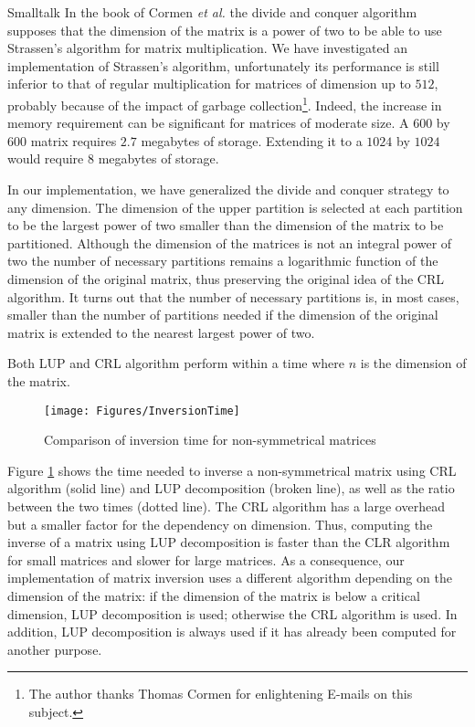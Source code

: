 \begin{displaycode}{Smalltalk}
In the book of Cormen \textit{et al.} \cite{CorLeiRiv} the divide and
conquer algorithm supposes that the dimension of the matrix is a
power of two to be able to use Strassen's algorithm for matrix
multiplication. We have investigated an implementation of
Strassen's algorithm, unfortunately its performance is still
inferior to that of regular multiplication for matrices of
dimension up to $512$, probably because of the impact of garbage
collection\footnote{The author thanks Thomas Cormen for
enlightening E-mails on this subject.}. Indeed, the increase in
memory requirement can be significant for matrices of moderate
size. A $600$ by $600$ matrix requires $2.7$ megabytes of storage.
Extending it to a $1024$ by $1024$ would require $8$ megabytes of
storage.

 In our implementation, we have
generalized the divide and conquer strategy to any dimension. The
dimension of the upper partition is selected at each partition to
be the largest power of two smaller than the dimension of the
matrix to be partitioned. Although the dimension of the matrices
is not an integral power of two the number of necessary partitions
remains a logarithmic function of the dimension of the original
matrix, thus preserving the original idea of the CRL algorithm. It
turns out that the number of necessary partitions is, in most
cases, smaller than the number of partitions needed if the
dimension of the original matrix is extended to the nearest
largest power of two.

Both LUP and CRL algorithm perform within a time  where
$n$ is the dimension of the matrix.
\begin{figure}
\centering\texttt{[image: Figures/InversionTime]}
\caption{Comparison of inversion time for non-symmetrical
matrices}\label{fig:inversionTime}
\end{figure}
Figure \ref{fig:inversionTime} shows the time needed to inverse a
non-symmetrical matrix using CRL algorithm (solid line) and LUP
decomposition (broken line), as well as the ratio between the two
times (dotted line). The CRL algorithm has a large overhead but a
smaller factor for the dependency on dimension. Thus, computing
the inverse of a matrix using LUP decomposition is faster than the
CLR algorithm for small matrices and slower for large matrices. As
a consequence, our implementation of matrix inversion uses a
different algorithm depending on the dimension of the matrix: if
the dimension of the matrix is below a critical dimension, LUP
decomposition is used; otherwise the CRL algorithm is used. In
addition, LUP decomposition is always used if it has already been
computed for another purpose.


\end{displaycode}
